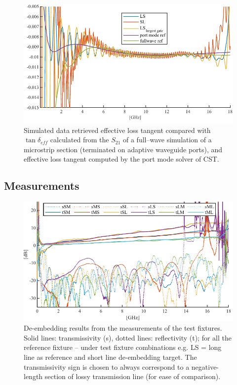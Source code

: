 \documentclass[11pt,a4paper]{article}
\begin{document}
    \begin{figure}[!h]
        \includegraphics[width=\textwidth]{tandsim}
        \caption{Simulated data retrieved effective loss tangent compared with $\tan\delta_{eff}$ calculated from
        the $S_{21}$ of a full--wave simulation of a microstrip section (terminated on adaptive waveguide ports),
            and effective loss tangent computed by the port mode solver of CST.}
        \label{fig:tandsim}
    \end{figure}

    \subsection{Measurements}
    \label{subsec:measurements}
    \begin{figure}[!h]
        \includegraphics[width=\textwidth]{sparameas}
        \caption{De-embedding results from the measurements of the test fixtures.
        Solid lines: transmissivity (s), dotted lines: reflectivity (t);
        for all the reference fixture -- under test fixture combinations e.g. LS = long line as reference and short line de-embedding target.
        The transmissivity sign is chosen to always correspond to a negative-length section
        of lossy transmission line (for ease of comparison).}
        \label{fig:sparameas}
    \end{figure}
\end{document}
